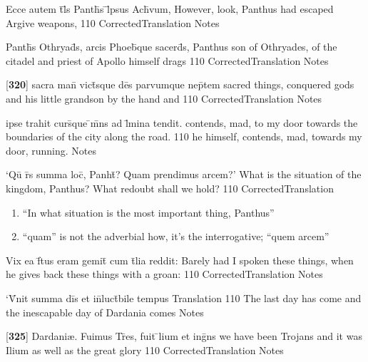 \latline
  {Ecce autem t\={}l\={\macron {\i}}s Panth\={}s \={}l\={}psus Ach\={\macron {\i}}vum,}
  { However, look, Panthus had escaped Argive weapons, }
  {110}
  { CorrectedTranslation }
  { Notes }


\latline
  {Panth\={}s Othryad\={}s, arcis Phoeb\={\macron {\i}}que sacerd\={}s,}
  { Panthus son of Othryades, of the citadel and priest of Apollo himself drags }
  {110}
  { CorrectedTranslation }
  { Notes }


\latline
  {[\textbf{320}] sacra man\={} vict\={}sque de\={}s parvumque nep\={}tem}
  { sacred things, conquered gods and his little grandson by the hand and  }
  {110}
  { CorrectedTranslation }
  { Notes }


\latline
  {ipse trahit curs\={}que \={}m\={}ns ad l\={\macron {\i}}mina tendit.}
  { contends, mad, to my door towards the boundaries of the city along the road. }
  {110}
  { he himself, contends, mad, towards my door, running. }
  { Notes }


\latline
  {`Qu\={} r\={}s summa loc\={}, Panht\={}?  Quam prendimus arcem?'}
  { What is the situation of the kingdom, Panthus?  What redoubt shall we hold? }
  {110}
  { CorrectedTranslation }
  { \begin{enumerate}
  	\item ``In what situation is the most important thing, Panthus''
  	\item ``quam'' is not the adverbial how, it's the interrogative; ``quem arcem''
  \end{enumerate} }


\latline
  {Vix ea f\={}tus eram gemit\={} cum t\={}lia reddit:}
  { Barely had I spoken these things, when he gives back these things with a groan: }
  {110}
  { CorrectedTranslation }
  { Notes }


\latline
  {`V\={}nit summa di\={}s et in\={}luct\={}bile tempus}
  { Translation }
  {110}
  { The last day has come and the inescapable day of Dardania comes }
  { Notes }


\latline
  {[\textbf{325}] Dardani{\ae}.  Fuimus Tr\={}es, fuit \={}lium et ing\={}ns}
  { we have been Trojans and it was Ilium as well as the great glory }
  {110}
  { CorrectedTranslation }
  { Notes }


